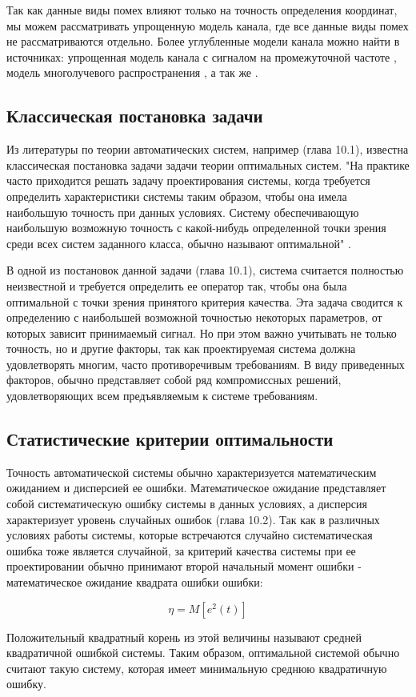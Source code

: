 Так как данные виды помех влияют только на точность определения координат, мы можем рассматривать упрощенную модель
канала, где все данные виды помех не рассматриваются отдельно. Более углубленные модели канала можно найти в
источниках: упрощенная модель канала с сигналом на промежуточной частоте \cite{lei_dong_phd}, модель многолучевого
распространения \cite{hannah_phd}, а так же \cite{burns_model, corbell_model, crs_model, brown_model}.
 
\subsection{Классическая постановка задачи}
\label{sec1_FIXME}

Из литературы по теории автоматических систем, например \cite{pugachev} (глава 10.1), известна классическая постановка
задачи задачи теории оптимальных систем. "На практике часто приходится решать задачу проектирования системы, когда
требуется определить характеристики системы таким образом, чтобы она имела наибольшую точность при данных условиях.
Систему обеспечивающую наибольшую возможную точность с какой-нибудь определенной точки зрения среди всех систем
заданного класса, обычно называют оптимальной" \cite{pugachev}.

В одной из постановок данной задачи \cite{pugachev} (глава 10.1), система считается полностью неизвестной
и требуется определить ее оператор так, чтобы она была оптимальной с точки зрения принятого критерия качества. Эта
задача сводится к определению с наибольшей возможной точностью некоторых параметров, от которых зависит принимаемый
сигнал. Но при этом важно учитывать не только точность, но и другие факторы, так как проектируемая система должна
удовлетворять многим, часто противоречивым требованиям. В виду приведенных факторов, обычно представляет собой
ряд компромиссных решений, удовлетворяющих всем предъявляемым к системе требованиям.

\subsection{Статистические критерии оптимальности}
Точность автоматической системы обычно характеризуется математическим ожиданием и дисперсией ее ошибки.
Математическое ожидание представляет собой систематическую ошибку системы в данных условиях, а дисперсия
характеризует уровень случайных ошибок \cite{pugachev} (глава 10.2). Так как в различных условиях работы
системы, которые встречаются случайно систематическая ошибка тоже является случайной, за критерий качества
системы при ее проектировании обычно принимают второй начальный момент ошибки - математическое ожидание
квадрата ошибки ошибки:
\begin{center}
\begin{equation}
	\label{eq:stat_err_prob}
	\eta = M[e^2(t)]
\end{equation}
\end{center}
Положительный квадратный корень из этой величины называют средней квадратичной ошибкой системы. Таким образом,
оптимальной системой обычно считают такую систему, которая имеет минимальную среднюю квадратичную ошибку.

